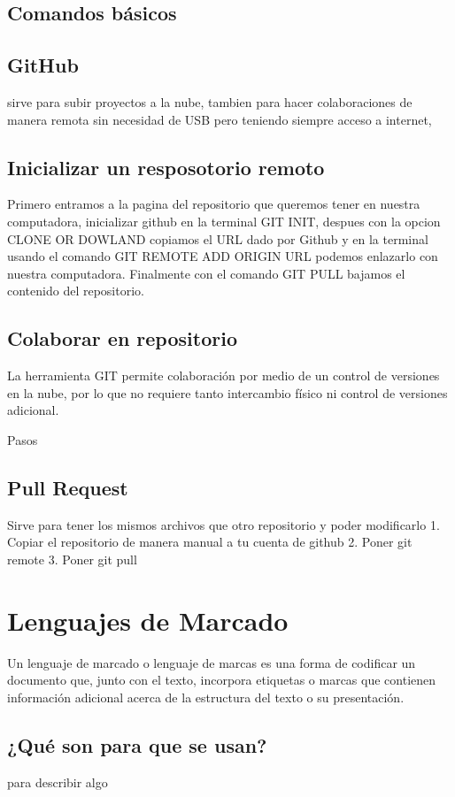 \documentclass[11pt,letterpaper]{article}
\begin{document}
\subsection{Comandos básicos}

\subsection{GitHub}
 sirve para subir proyectos a la nube, tambien para hacer colaboraciones de manera remota sin necesidad de USB pero teniendo siempre  acceso a internet,
\subsection{Inicializar un resposotorio remoto}

Primero entramos a la pagina del repositorio que queremos tener en nuestra computadora, inicializar github en la terminal GIT INIT, despues con la opcion CLONE OR DOWLAND copiamos el URL dado por Github y en la terminal usando el comando GIT REMOTE ADD ORIGIN URL podemos enlazarlo con nuestra computadora. Finalmente con el comando GIT PULL bajamos el contenido del repositorio.

\subsection{Colaborar en repositorio}
La herramienta GIT permite colaboración por medio de un control de versiones en la nube, por lo que no requiere tanto intercambio físico ni control de versiones adicional.

Pasos

\subsection{Pull Request}
Sirve para tener los mismos archivos que otro repositorio y poder modificarlo
1. Copiar el repositorio de manera manual a tu cuenta de github
2. Poner git remote
3. Poner git pull
\section{Lenguajes de Marcado}
Un lenguaje de marcado o lenguaje de marcas es una forma de codificar un documento que, junto con el texto, incorpora etiquetas o marcas que contienen información adicional acerca de la estructura del texto o su presentación.


\subsection{¿Qué son para que se usan?}
para describir algo 
\end{document}
